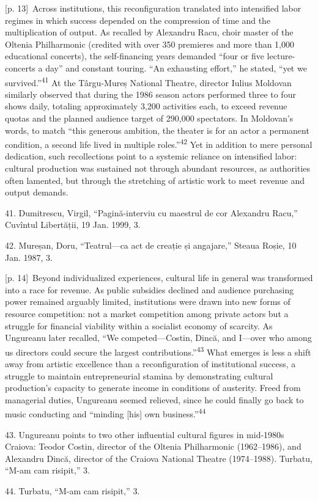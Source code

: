 \documentclass[10pt,a4paper]{article}
\begin{document}
{\scriptsize\color{gray} [p. 13]}\ Across institutions, this reconfiguration translated into intensified labor regimes in which success depended on the compression of time and the multiplication of output. As recalled by Alexandru Racu, choir master of the Oltenia Philharmonic (credited with over 350 premieres and more than 1,000 educational concerts), the self-financing years demanded “four or five lecture-concerts a day” and constant touring. “An exhausting effort,” he stated, “yet we survived.”\nobreak\textsuperscript{41} At the Târgu-Mureș National Theatre, director Iulius Moldovan similarly observed that during the 1986 season actors performed three to four shows daily, totaling approximately 3,200 activities each, to exceed revenue quotas and the planned audience target of 290,000 spectators. In Moldovan’s words, to match “this generous ambition, the theater is for an actor a permanent condition, a second life lived in multiple roles.”\nobreak\textsuperscript{42} Yet in addition to mere personal dedication, such recollections point to a systemic reliance on intensified labor: cultural production was sustained not through abundant resources, as authorities often lamented, but through the stretching of artistic work to meet revenue and output demands.\par{\small 41. Dumitrescu, Virgil, “Pagină-interviu cu maestrul de cor Alexandru Racu,” Cuvîntul Libertății, 19 Jan. 1999, 3.\par}{\small 42. Mureșan, Doru, “Teatrul—ca act de creație și angajare,” Steaua Roșie, 10 Jan. 1987, 3.\par}
{\scriptsize\color{gray} [p. 14]}\ Beyond individualized experiences, cultural life in general was transformed into a race for revenue. As public subsidies declined and audience purchasing power remained arguably limited, institutions were drawn into new forms of resource competition: not a market competition among private actors but a struggle for financial viability within a socialist economy of scarcity. As Ungureanu later recalled, “We competed—Costin, Dincă, and I—over who among us directors could secure the largest contributions.”\nobreak\textsuperscript{43} What emerges is less a shift away from artistic excellence than a reconfiguration of institutional success, a struggle to maintain entrepreneurial stamina by demonstrating cultural production’s capacity to generate income in conditions of austerity. Freed from managerial duties, Ungureanu seemed relieved, since he could finally go back to music conducting and “minding [his] own business.”\nobreak\textsuperscript{44}\par{\small 43. Ungureanu points to two other influential cultural figures in mid-1980s Craiova: Teodor Costin, director of the Oltenia Philharmonic (1962–1986), and Alexandru Dincă, director of the Craiova National Theatre (1974–1988). Turbatu, “M-am cam risipit,” 3.\par}{\small 44. Turbatu, “M-am cam risipit,” 3.\par}
\end{document}
